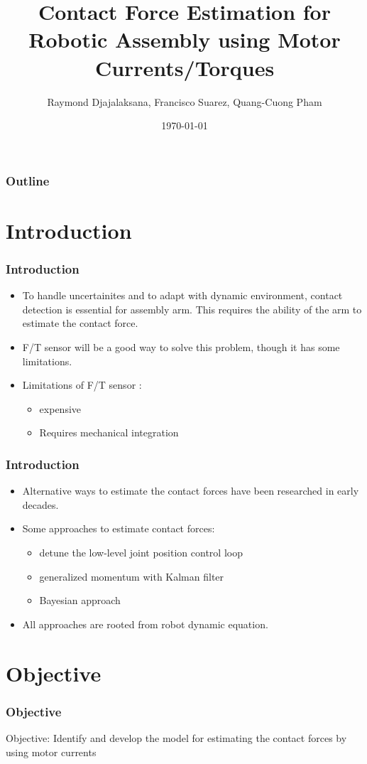 \documentclass[12pt,english]{beamer}
\title{Contact Force Estimation for Robotic Assembly using Motor Currents/Torques}
\author{Raymond Djajalaksana, Francisco Suarez, Quang-Cuong Pham}
\date{\today}
\begin{document}
  \frame{\titlepage}
  
  \begin{frame}
    \frametitle{Outline}
    \tableofcontents
  \end{frame}
    
  \section{Introduction}  
  \begin{frame}
    \frametitle{Introduction}
    \begin{itemize}
      \item To handle uncertainites and to adapt with dynamic environment, contact detection is essential for assembly arm. This requires the ability of the arm to estimate the contact force.
      \item F/T sensor will be a good way to solve this problem, though it has some limitations.
      \item Limitations of F/T sensor :
      \begin{itemize}
        \item expensive
        \item Requires mechanical integration
      \end{itemize}
    \end{itemize}
  \end{frame}
  
  \begin{frame}
    \frametitle{Introduction}
    \begin{itemize}
      \item Alternative ways to estimate the contact forces have been researched in early decades.
      \item Some approaches to estimate contact forces:
      \begin{itemize}
        \item detune the low-level joint position control loop
        \item generalized momentum with Kalman filter
        \item Bayesian approach
      \end{itemize}
      \item All approaches are rooted from robot dynamic equation.
    \end{itemize}
  \end{frame}
  \section{Objective}
  \begin{frame}
    \frametitle{Objective}
    Objective: Identify and develop the model for estimating the contact forces by using motor currents
  \end{frame}
  
\end{document}
